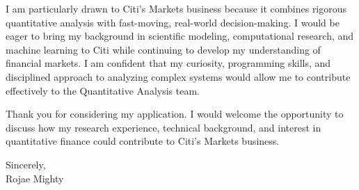 \documentclass[10pt,letterpaper]{article}
\begin{document}
I am particularly drawn to Citi's Markets business because it combines rigorous quantitative analysis with fast-moving, real-world decision-making. I would be eager to bring my background in scientific modeling, computational research, and machine learning to Citi while continuing to develop my understanding of financial markets. I am confident that my curiosity, programming skills, and disciplined approach to analyzing complex systems would allow me to contribute effectively to the Quantitative Analysis team.

Thank you for considering my application. I would welcome the opportunity to discuss how my research experience, technical background, and interest in quantitative finance could contribute to Citi's Markets business.

\vspace{4pt}
Sincerely,\\[12pt]
Rojae Mighty
\end{document}
